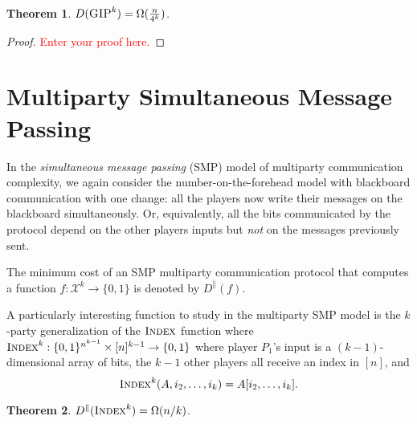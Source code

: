 \documentclass[11pt]{amsart}
\theoremstyle{plain}
\newtheorem{theorem}{Theorem}
\theoremstyle{definition}
\theoremstyle{plain}
\newcommand{\calX}{\mathcal{X}}
\newcommand{\GIP}{\textsc{GIP}}
\newcommand{\Index}{\textsc{Index}}
\newcommand{\replacethistext}[1]{\textcolor{red}{#1}}
\begin{document}
\begin{theorem}
$D(\GIP^k) = \Omega(\frac{n}{4^k})$.
\end{theorem}

\begin{proof}
\replacethistext{Enter your proof here.}
\end{proof}



\newpage 
\section{Multiparty Simultaneous Message Passing}

In the \emph{simultaneous message passing} (SMP) model of multiparty communication complexity, we again consider the number-on-the-forehead model with blackboard communication with one change: all the players now write their messages on the blackboard simultaneously. Or, equivalently, all the bits communicated by the protocol depend on the other players inputs but \emph{not} on the messages previously sent.

The minimum cost of an SMP multiparty communication protocol that computes a function $f : \calX^k \to \{0,1\}$ is denoted by $D^\parallel(f)$.

A particularly interesting function to study in the multiparty SMP model is the $k$-party generalization of the $\Index$ function where $\Index^k : \{0,1\}^{n^{k-1}} \times [n]^{k-1} \to \{0,1\}$ where player $P_1$'s input is a $(k-1)$-dimensional array of bits, the $k-1$ other players all receive an index in $[n]$, and
\[
\Index^k(A,i_2,\ldots,i_k) = A[i_2,\ldots,i_k].
\]

\begin{theorem}
$D^\parallel(\Index^k) = \Omega(n/k)$.
\end{theorem}
\end{document}
